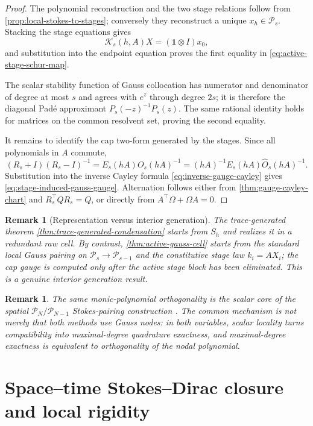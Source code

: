 \documentclass[11pt,a4paper]{article}
\newtheorem{remark}[theorem]{Remark}
\newcommand{\cP}{\mathcal P}
\newcommand{\one}{\bm 1}
\begin{document}
\begin{proof}
The polynomial reconstruction and the two stage relations follow from
\cref{prop:local-stokes-to-stages}; conversely they reconstruct a unique
\(x_h\in\mathcal P_s\).  Stacking the
stage equations gives
\[
 \mathcal K_s(h,A)X=(\one\otimes I)x_0,
\]
and substitution into the endpoint equation proves the first equality in
\cref{eq:active-stage-schur-map}.

The scalar stability function of Gauss collocation has numerator and
denominator of degree at most \(s\) and agrees with \(e^z\) through degree
\(2s\); it is therefore the diagonal Pad\'e approximant
\(P_s(-z)^{-1}P_s(z)\).  The same rational identity holds for matrices on
the common resolvent set, proving the second equality.

It remains to identify the cap two-form generated by the stages.  Since
all polynomials in \(A\) commute,
\[
 (R_s+I)(R_s-I)^{-1}
 =E_s(hA)O_s(hA)^{-1}
 =(hA)^{-1}E_s(hA)\widehat O_s(hA)^{-1}.
\]
Substitution into the inverse Cayley formula
\cref{eq:inverse-gauge-cayley} gives
\cref{eq:stage-induced-gauss-gauge}.  Alternation follows either from
\cref{thm:gauge-cayley-chart} and \(R_s^\top QR_s=Q\), or directly from
\(A^\top\Omega+\Omega A=0\).
\end{proof}

\begin{remark}[Representation versus interior generation]
\label{rem:representation-generation}
The trace-generated theorem \cref{thm:trace-generated-condensation}
starts from \(S_h\) and realizes it in a redundant raw cell.  By contrast,
\cref{thm:active-gauss-cell} starts from the standard local Gauss pairing
on \(\mathcal P_s\to\mathcal P_{s-1}\) and the constitutive stage law
\(k_i=AX_i\); the cap gauge is computed only after the active stage block
has been eliminated.  This is a genuine interior generation result.
\end{remark}

\begin{remark}
The same monic-polynomial orthogonality is the scalar core of the spatial
\(\cP_N/\cP_{N-1}\) Stokes-pairing construction
\cite{moulla2012}. The common mechanism is not merely that both methods
use Gauss nodes: in both variables, scalar locality turns compatibility
into maximal-degree quadrature exactness, and maximal-degree exactness is
equivalent to orthogonality of the nodal polynomial.
\end{remark}

\section{Space--time Stokes--Dirac closure and local rigidity}
\end{document}
